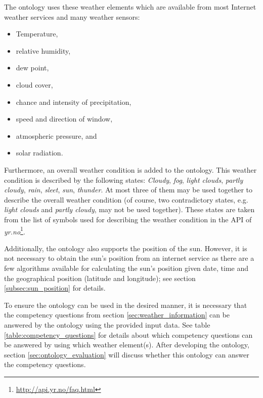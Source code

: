 The ontology uses these weather elements which are available from most Internet weather services and many weather sensors:
\begin{itemize}
  \item Temperature,
  \item relative humidity,
  \item dew point,
  \item cloud cover,
  \item chance and intensity of precipitation,
  \item speed and direction of window,
  \item atmospheric pressure, and
  \item solar radiation.
\end{itemize}

Furthermore, an overall weather condition is added to the ontology. This weather condition is described by the following states: \emph{Cloudy}, \emph{fog}, \emph{light clouds}, \emph{partly cloudy}, \emph{rain}, \emph{sleet}, \emph{sun}, \emph{thunder}. At most three of them may be used together to describe the overall weather condition (of course, two contradictory states, e.g. \emph{light clouds} and \emph{partly cloudy}, may not be used together). These states are taken from the list of symbols used for describing the weather condition in the API of \emph{yr.no}\footnote{\href{http://api.yr.no/faq.html}{http://api.yr.no/faq.html}}.

Additionally, the ontology also supports the position of the sun. However, it is not necessary to obtain the sun's position from an internet service as there are a few algorithms available for calculating the sun's position given date, time and the geographical position (latitude and longitude); see section \ref{subsec:sun_position} for details.

To ensure the ontology can be used in the desired manner, it is necessary that the competency questions from section \ref{sec:weather_information} can be answered by the ontology using the provided input data. See table \ref{table:competency_questions} for details about which competency questions can be answered by using which weather element(s). After developing the ontology, section \ref{sec:ontology_evaluation} will discuss whether this ontology can answer the competency questions.


